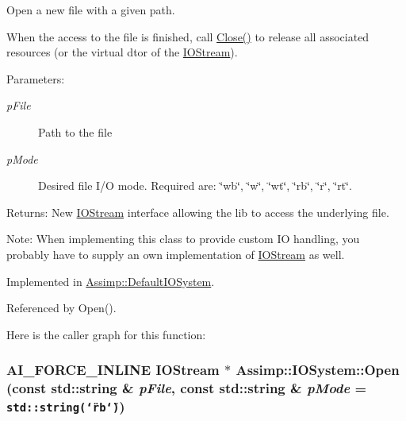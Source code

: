 Open a new file with a given path. 

When the access to the file is finished, call \hyperlink{class_assimp_1_1_i_o_system_8c334d60f04bceeb6bd0157d21723f3e}{Close()} to release all associated resources (or the virtual dtor of the \hyperlink{class_assimp_1_1_i_o_stream}{IOStream}).

\begin{Desc}
\item[Parameters:]
\begin{description}
\item[{\em pFile}]Path to the file \item[{\em pMode}]Desired file I/O mode. Required are: \char`\"{}wb\char`\"{}, \char`\"{}w\char`\"{}, \char`\"{}wt\char`\"{}, \char`\"{}rb\char`\"{}, \char`\"{}r\char`\"{}, \char`\"{}rt\char`\"{}.\end{description}
\end{Desc}
\begin{Desc}
\item[Returns:]New \hyperlink{class_assimp_1_1_i_o_stream}{IOStream} interface allowing the lib to access the underlying file. \end{Desc}
\begin{Desc}
\item[Note:]When implementing this class to provide custom IO handling, you probably have to supply an own implementation of \hyperlink{class_assimp_1_1_i_o_stream}{IOStream} as well. \end{Desc}


Implemented in \hyperlink{class_assimp_1_1_default_i_o_system_9c8da3d63312f47b2dec83ec90aa2c4d}{Assimp::DefaultIOSystem}.

Referenced by Open().

Here is the caller graph for this function:\hypertarget{class_assimp_1_1_i_o_system_ef35fabc9bd49fb83bfd4f12a94083c3}{
\subsubsection[Open]{\setlength{\rightskip}{0pt plus 5cm}AI\_\-FORCE\_\-INLINE {\bf IOStream} $\ast$ Assimp::IOSystem::Open (const std::string \& {\em pFile}, \/  const std::string \& {\em pMode} = {\tt std::string(\char`\"{}rb\char`\"{})})}}
\label{class_assimp_1_1_i_o_system_ef35fabc9bd49fb83bfd4f12a94083c3}


